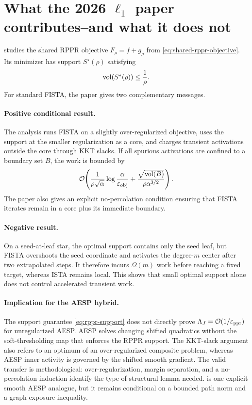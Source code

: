 \section{What the 2026 $\ell_1$ paper contributes--and what it does not}
\label{sec:l1-paper}

\citet{fountoulakis2026complexity} studies the shared RPPR objective
$F_\rho=f+g_\rho$ from \cref{eq:shared-rppr-objective}.  Its minimizer has
support $S^\star(\rho)$ satisfying
\begin{equation}
  \operatorname{vol}(S^\star(\rho))\leq\frac1\rho.
  \label{eq:rppr-support}
\end{equation}
For standard FISTA, the paper gives two complementary messages.

\paragraph{Positive conditional result.}
The analysis runs FISTA on a slightly over-regularized objective, uses the
support at the smaller regularization as a core, and charges transient
activations outside the core through KKT slacks.  If all spurious activations
are confined to a boundary set $B$, the work is bounded by
\begin{equation}
  \mathcal{O}\!\left(
    \frac1{\rho\sqrt\alpha}\log\frac{\alpha}{\varepsilon_{\mathrm{obj}}}
    +\frac{\sqrt{\operatorname{vol}(B)}}{\rho\alpha^{3/2}}
  \right).
  \label{eq:fmr-work}
\end{equation}
The paper also gives an explicit no-percolation condition ensuring that FISTA
iterates remain in a core plus its immediate boundary.

\paragraph{Negative result.}
On a seed-at-leaf star, the optimal support contains only the seed leaf, but
FISTA overshoots the seed coordinate and activates the degree-$m$ center after
two extrapolated steps.  It therefore incurs $\Omega(m)$ work before reaching
a fixed target, whereas ISTA remains local.  This shows that small optimal
support alone does not control accelerated transient work.

\paragraph{Implication for the AESP hybrid.}
The support guarantee \cref{eq:rppr-support} does not directly prove
$\Lambda_J=\mathcal{O}(1/\varepsilon_{\mathrm{ppr}})$ for unregularized AESP.  AESP solves changing shifted
quadratics without the soft-thresholding map that enforces the RPPR support.
The KKT-slack argument also refers to an optimum of an over-regularized
composite problem, whereas AESP inner activity is governed by the shifted
smooth gradient.  The valid transfer is methodological: over-regularization,
margin separation, and a no-percolation induction identify the type of
structural lemma needed.   is one explicit smooth
AESP analogue, but it remains conditional on a bounded path norm and a graph
exposure inequality.


